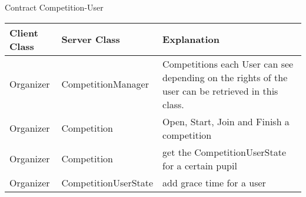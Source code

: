 \begin{subsubsection}{Contract Competition-User}
	\begin{tabular}{l l l }
	  Client Class & Server Class & Explanation\\ \hline
	  Organizer & CompetitionManager & Competitions each User can see depending on the rights
	  of the user can be retrieved in this class.\\
	  Organizer & Competition & Open, Start, Join and Finish a competition\\
	  Organizer & Competition & get the CompetitionUserState for a certain pupil\\
	  Organizer & CompetitionUserState & add grace time for a user\\
	\end{tabular}
\end{subsubsection}